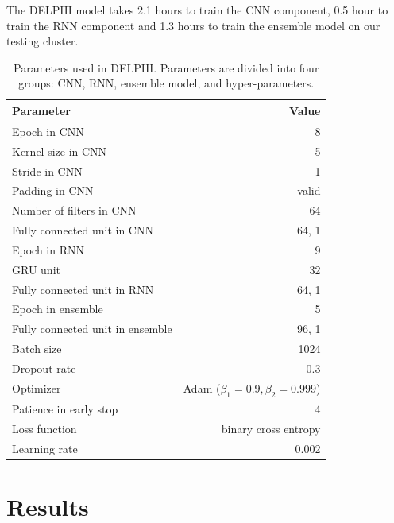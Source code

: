 \documentclass{bioinfo}
\begin{document}
\begin{methods}
The DELPHI model takes 2.1 hours to train the CNN component, 0.5 hour to train the RNN component and 1.3 hours to train the ensemble model on our testing cluster.

\begin{table}[H]
  \centering
  \caption{Parameters used in DELPHI. Parameters are divided into four groups: CNN, RNN, ensemble model, and hyper-parameters.}
    \begin{tabular}{@{}p{4.4cm}r@{}}
    \toprule
    Parameter & Value \\
    \midrule
    Epoch in CNN & 8 \\
    Kernel size in CNN & 5 \\
    Stride in CNN & 1 \\
    Padding in CNN & valid \\
    Number of filters in CNN & 64 \\
    Fully connected unit in CNN & 64, 1 \\
    \hline
    Epoch in RNN & 9 \\
    GRU unit & 32 \\
    Fully connected unit in RNN & 64, 1 \\
    \hline
    Epoch in ensemble & 5 \\
    Fully connected unit in ensemble & 96, 1 \\
    \hline
    Batch size & 1024 \\
    Dropout rate & 0.3 \\
    Optimizer & Adam ($\beta_1=0.9, \beta_2=0.999$) \\
    Patience in early stop & 4 \\
    Loss function & binary cross entropy \\
    Learning rate & 0.002 \\
    \bottomrule
    \end{tabular}%
  \label{tab_parameter}%
\end{table}%

\end{methods}

\section{Results}
\end{document}
